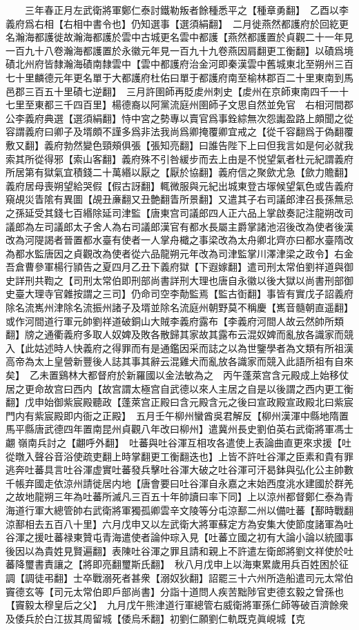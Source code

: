 　　三年春正月左武衛將軍鄭仁泰討鐵勒叛者餘種悉平之【種章勇翻】　乙酉以李義府爲右相【右相中書令也】仍知選事【選須絹翻】　二月徙燕然都護府於回紇更名瀚海都護徙故瀚海都護於雲中古城更名雲中都護【燕然都護置於貞觀二十一年見一百九十八卷瀚海都護置於永徽元年見一百九十九卷燕因肩翻更工衡翻】以磧爲境磧北州府皆隸瀚海磧南隸雲中【雲中都護府治金河即秦漢雲中舊城東北至朔州三百七十里麟德元年更名單于大都護府杜佑曰單于都護府南至榆林郡百二十里東南到馬邑郡三百五十里磧七逆翻】　三月許圉師再貶䖍州刺史【䖍州在京師東南四千一十七里至東都三千四百里】楊德裔以阿黨流庭州圉師子文思自然並免官　右相河間郡公李義府典選【選須絹翻】恃中宮之勢專以賣官爲事銓綜無次怨讟盈路上頗聞之從容謂義府曰卿子及壻頗不謹多爲非法我尚爲卿掩覆卿宜戒之【從千容翻爲于偽翻覆敷又翻】義府勃然變色頸頰俱張【張知亮翻】曰誰告陛下上曰但我言如是何必就我索其所從得邪【索山客翻】義府殊不引咎緩步而去上由是不悦望氣者杜元紀謂義府所居第有獄氣宜積錢二十萬緡以厭之【厭於協翻】義府信之聚歛尤急【歛力贍翻】義府居母喪朔望給哭假【假古訝翻】輒微服與元紀出城東登古塜候望氣色或告義府窺覘災眚隂有異圖【覘丑亷翻又丑艶翻眚所景翻】又遣其子右司議郎津召長孫無忌之孫延受其錢七百緡除延司津監【唐東宫司議郎四人正六品上掌啟奏記注龍朔改司議郎為左司議郎太子舍人為右司議郎漢官有都水長屬主爵掌諸池沼後改為使者後漢改為河隄謁者晉置都水臺有使者一人掌舟檝之事梁改為太舟卿北齊亦曰都水臺隋改為都水監唐因之貞觀改為使者從六品龍朔元年改為司津監掌川澤津梁之政令】右金吾倉曹參軍楊行頴告之夏四月乙丑下義府獄【下遐嫁翻】遣司刑太常伯劉祥道與御史詳刑共鞫之【司刑太常伯即刑部尚書詳刑大理也唐自永徽以後大獄以尚書刑部御史臺大理寺官雜按謂之三司】仍命司空李勣監焉【監古衘翻】事皆有實戊子詔義府除名流嶲州津除名流振州諸子及壻並除名流庭州朝野莫不稱慶【嶲音髓朝直遥翻】或作河間道行軍元帥劉祥道破銅山大賊李義府露布【李義府河間人故云然帥所類翻】牓之通衢義府多取人奴婢及敗各散歸其家故其露布云混奴婢而亂放各識家而競入【此姑述時人快義府之得罪而有是通鑑因采而誌之以為世鑒學者為文類有所祖漢高帝為太上皇營新豐後人誌其事其辭云混雞犬而亂放各識家而競入此語所祖有自來矣】　乙未置鷄林大都督府於新羅國以金法敏為之　丙午蓬萊宫含元殿成上始移仗居之更命故宫曰西内【故宫謂太極宫自武德以來人主居之自是以後謂之西内更工衡翻】戊申始御紫宸殿聽政【蓬萊宫正殿曰含元殿含元之後曰宣政殿宣政殿北曰紫宸門内有紫宸殿即内衙之正殿】　五月壬午柳州蠻酋吳君解反【柳州漢渾中縣地隋置馬平縣唐武德四年置南昆州貞觀八年改曰柳州】遣冀州長史劉伯英右武衛將軍馮士翽嶺南兵討之【翽呼外翻】　吐蕃與吐谷渾互相攻各遣使上表論曲直更來求援【吐從暾入聲谷音浴使疏吏翻上時掌翻更工衡翻迭也】上皆不許吐谷渾之臣素和貴有罪逃奔吐蕃具言吐谷渾虚實吐蕃發兵擊吐谷渾大破之吐谷渾可汗曷鉢與弘化公主帥數千帳弃國走依涼州請徙居内地【唐會要曰吐谷渾自永嘉之末始西度洮水建國於群羌之故地龍朔三年為吐蕃所滅凡三百五十年帥讀曰率下同】上以涼州都督鄭仁泰為青海道行軍大總管帥右武衛將軍獨孤卿雲辛文陵等分屯涼鄯二州以備吐蕃【鄯時戰翻涼鄯相去五百八十里】六月戊申又以左武衛大將軍蘇定方為安集大使節度諸軍為吐谷渾之援吐蕃禄東贊屯青海遣使者論仲琮入見【吐蕃立國之初有大論小論以統國事後因以為貴姓見賢遍翻】表陳吐谷渾之罪且請和親上不許遣左衛郎將劉文祥使於吐蕃降璽書責讓之【將即亮翻璽斯氏翻】　秋八月戊申上以海東累歲用兵百姓困於征調【調徒弔翻】士卒戰溺死者甚衆【溺奴狄翻】詔罷三十六州所造船遣司元太常伯竇德玄等【司元太常伯即戶部尚書】分詣十道問人疾苦黜陟官吏德玄毅之曾孫也【竇毅太穆皇后之父】　九月戊午熊津道行軍總管右威衛將軍孫仁師等破百濟餘衆及倭兵於白江拔其周留城【倭烏禾翻】初劉仁願劉仁軌既克眞峴城【克